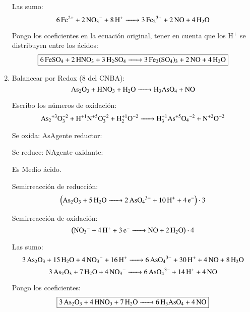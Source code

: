 \begin{enumerate}
Las sumo:
$$
\ce{6Fe^{2+} + 2NO_3^- + 8H^+ -> 3Fe_2^{3+} + 2NO + 4H_2O}
$$

Pongo los coeficientes en la ecuación original, tener en cuenta que los H$^+$ se distribuyen entre los ácidos:
$$\fbox{\ce{6FeSO_4 + 2HNO_3 + 3H_2SO_4 -> 3Fe_2(SO4)3 + 2NO + 4H2O}}$$


\item Balancear por Redox (8 del CNBA):
$$\ce{
As2O3 + HNO3 + H2O -> H3AsO4 + NO
}$$

Escribo los números de oxidación:
$$\ce{
As2^{+3}O^{-2}3 + H^{+1}N^{+5}O^{-2}3 + H^{+1}2O^{-2} -> H^{+1}3As^{+5}O4^{-2} + N^{+2}O^{-2}
}$$

\hfil Se oxida: As\hfil Agente reductor: \hfil

\hfil Se reduce: N\hfil Agente oxidante: \hfil

Es Medio ácido.

\begin{multicols}{2}
Semirreacción de reducción:
$$\left(\ce{
As2O3 + 5H2O -> 2AsO4^{3-} + 10H^+ +4e^-
}\right)\cdot 3$$

Semirreacción de oxidación:
$$\left(\ce{
NO_3^{-} + 4H^+ +3e^- -> NO + 2H2O
}\right)\cdot 4$$
\end{multicols}

Las sumo:
$$\ce{
3As2O3 + 15H2O + 4NO3^- + 16H^+ -> 6AsO_4^{3-} + 30H^+ + 4NO + 8 H2O
}$$
$$\ce{
3As2O3 + 7H2O + 4NO3^- -> 6AsO_4^{3-} + 14H^+ + 4NO
}$$

Pongo los coeficientes:
$$\fbox{\ce{
3As2O3 + 4HNO3 + 7H2O -> 6H3AsO4 + 4NO}}$$

\end{enumerate}
